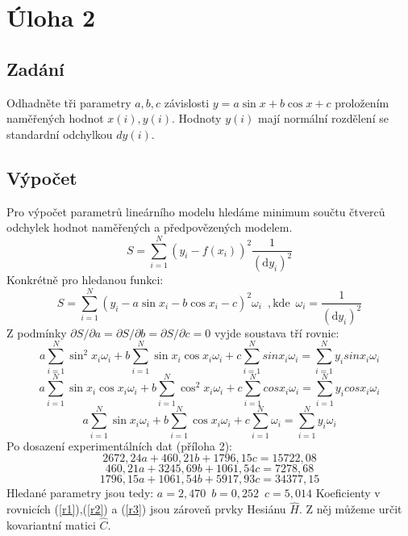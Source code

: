 \documentclass[12pt]{article}
\begin{document}
\section{Úloha 2}
\subsection{Zadání}
Odhadněte tři parametry $a,b,c$ závislosti $y=a \sin{x} + b \cos{x} +c$ proložením naměřených hodnot $x(i), y(i)$. Hodnoty $y(i)$ mají normální rozdělení se standardní odchylkou $dy(i)$.

\subsection{Výpočet}
Pro výpočet parametrů lineárního modelu hledáme minimum součtu čtverců odchylek hodnot naměřených a předpovězených modelem.
\begin{equation}S = \sum_{i=1}^N (y_i - f(x_i))^2 \frac{1}{(\mathrm{d}y_i)^2}\end{equation}
Konkrétně pro hledanou funkci:
\begin{equation}S = \sum_{i=1}^N (y_i - a\sin{x_i} - b\cos{x_i} - c)^2 \omega_i \,\,\,\mathrm{, kde}\,\,\, \omega_i = \frac{1}{(\mathrm{d}y_i)^2} \end{equation}
Z podmínky $\partial{S}/\partial{a}=\partial{S}/\partial{b}=\partial{S}/\partial{c}=0$ vyjde soustava tří rovnic:
\begin{equation}a\sum_{i=1}^N \sin^2{x_i} \omega_i + b \sum_{i=1}^N \sin{x_i}\cos{x_i} \omega_i + c\sum_{i=1}^N sin{x_i} \omega_i =  \sum_{i=1}^N y_i sin{x_i} \omega_i \end{equation}
\begin{equation}a\sum_{i=1}^N \sin{x_i}\cos{x_i} \omega_i + b \sum_{i=1}^N \cos^2{x_i}\omega_i + c\sum_{i=1}^N cos{x_i} \omega_i =  \sum_{i=1}^N y_i cos{x_i}\omega_i \end{equation}
\begin{equation}a\sum_{i=1}^N \sin{x_i} \omega_i + b \sum_{i=1}^N \cos{x_i}\omega_i + c\sum_{i=1}^N \omega_i =  \sum_{i=1}^N y_i \omega_i \end{equation}
Po dosazení experimentálních dat (příloha 2):
\begin{equation}\label{r1} 2672,24a + 460,21b + 1796,15c = 15722,08\end{equation}
\begin{equation}\label{r2}  460,21a + 3245,69b + 1061,54c = 7278,68\end{equation}
\begin{equation}\label{r3} 1796,15a + 1061,54b + 5917,93c = 34377,15\end{equation}
Hledané parametry jsou tedy: $a=2,470\,\,\, b=0,252\,\,\, c=5,014$
Koeficienty v rovnicích (\ref{r1}),(\ref{r2}) a (\ref{r3}) jsou zároveň prvky Hesiánu $\hat{H}$. Z něj můžeme určit kovariantní matici $\hat{C}$.
\end{document}
